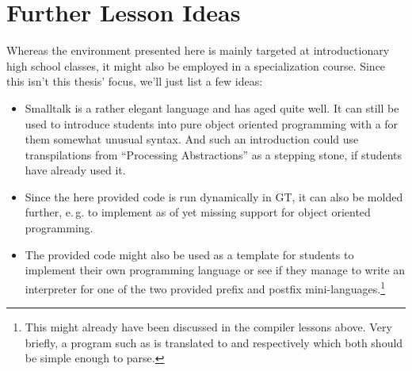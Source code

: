\section{Further Lesson Ideas} \label{sc_lesson_other}

Whereas the environment presented here is mainly targeted at introductionary high school classes, it might also be employed in a specialization course. Since this isn't this thesis' focus, we'll just list a few ideas:

\begin{itemize}
\item Smalltalk is a rather elegant language and has aged quite well. It can still be used to introduce students into pure object oriented programming with a for them somewhat unusual syntax. And such an introduction could use transpilations from ``Processing Abstractions'' as a stepping stone, if students have already used it.
\item Since the here provided code is run dynamically in \ac{GT}, it can also be molded further, e.\,g. to implement as of yet missing support for object oriented programming.
\item The provided code might also be used as a template for students to implement their own programming language or see if they manage to write an interpreter for one of the two provided prefix and postfix mini-languages.\footnote{This might already have been discussed in the compiler lessons above. Very briefly, a program such as  is translated to  and  respectively which both should be simple enough to parse.}
\end{itemize}
